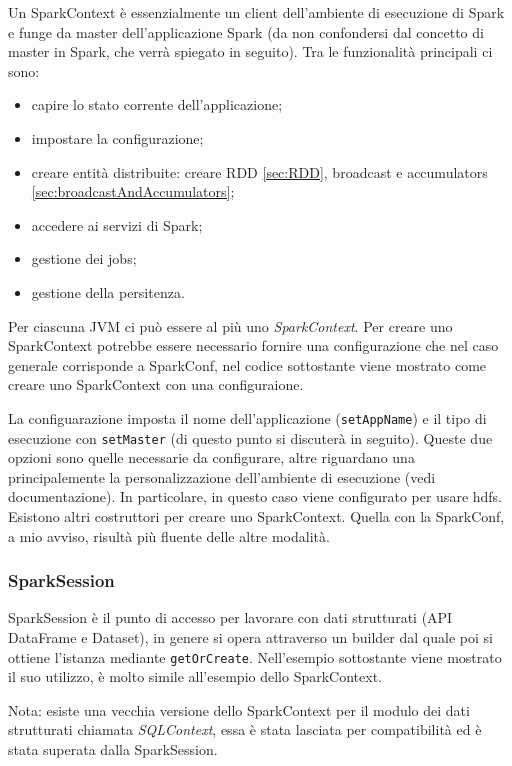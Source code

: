 \documentclass[12pt,italian]{article}
\begin{document}
Un SparkContext è essenzialmente un client dell'ambiente di esecuzione di Spark e funge da master dell'applicazione Spark (da non confondersi dal concetto di master in Spark, che verrà spiegato in seguito). Tra le funzionalità principali ci sono:
\begin{itemize}
	\item capire lo stato corrente dell'applicazione;
	\item impostare la configurazione;
	\item creare entità distribuite:  creare RDD \ref{sec:RDD}, broadcast e accumulators \ref{sec:broadcastAndAccumulators};
	\item accedere ai servizi di Spark;
	\item gestione dei jobs;
	\item gestione della persitenza.
\end{itemize}
Per ciascuna JVM ci può essere al più uno \textit{SparkContext}.
Per creare uno SparkContext potrebbe essere necessario fornire una configurazione che nel caso generale corrisponde a SparkConf, nel codice sottostante viene mostrato come creare uno SparkContext con una configuraione.


La configuarazione imposta il nome dell'applicazione (\texttt{setAppName}) e il tipo di esecuzione con \texttt{setMaster} (di questo punto si discuterà in seguito). Queste due opzioni sono quelle necessarie da configurare, altre riguardano una principalemente la personalizzazione dell'ambiente di esecuzione (vedi documentazione). In particolare, in questo caso viene configurato per usare hdfs.
Esistono altri costruttori per creare uno SparkContext. Quella con la SparkConf, a mio avviso, risultà più fluente delle altre modalità.
\subsubsection{SparkSession}\label{sec:SparkSession} 
SparkSession è il punto di accesso per lavorare con dati strutturati (API DataFrame e Dataset), in genere si opera attraverso un builder dal quale poi si ottiene l'istanza mediante \texttt{getOrCreate}. 
Nell'esempio sottostante viene mostrato il suo utilizzo, è molto simile all'esempio dello SparkContext.


Nota: esiste una vecchia versione dello SparkContext per il modulo dei dati strutturati chiamata \textit{SQLContext}, essa è stata lasciata per compatibilità ed è stata superata dalla SparkSession.
\end{document}
